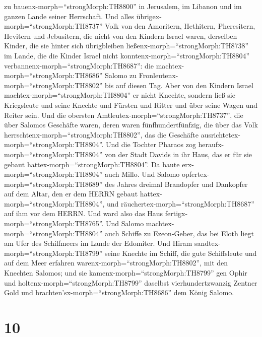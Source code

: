 zu bauenx-morph=``strongMorph:TH8800'' in Jerusalem, im Libanon und im
ganzen Lande seiner Herrschaft.  Und alles
übrigex-morph=``strongMorph:TH8737'' Volk von den Amoritern, Hethitern,
Pheresitern, Hevitern und Jebusitern, die nicht von den Kindern Israel
waren,  derselben Kinder, die sie hinter sich übrigbleiben
ließenx-morph=``strongMorph:TH8738'' im Lande, die die Kinder Israel
nicht konntenx-morph=``strongMorph:TH8804''
verbannenx-morph=``strongMorph:TH8687'': die
machtex-morph=``strongMorph:TH8686'' Salomo zu
Fronleutenx-morph=``strongMorph:TH8802'' bis auf diesen Tag.
 Aber von den Kindern Israel
machtex-morph=``strongMorph:TH8804'' er nicht Knechte, sondern ließ sie
Kriegsleute und seine Knechte und Fürsten und Ritter und über seine
Wagen und Reiter sein.  Und die obersten
Amtleutex-morph=``strongMorph:TH8737'', die über Salomos Geschäfte
waren, deren waren fünfhundertfünfzig, die über das Volk
herrschtenx-morph=``strongMorph:TH8802'', das die Geschäfte
ausrichtetex-morph=``strongMorph:TH8804''.  Und die Tochter
Pharaos zog heraufx-morph=``strongMorph:TH8804'' von der Stadt Davids in
ihr Haus, das er für sie gebaut hattex-morph=``strongMorph:TH8804''. Da
baute erx-morph=``strongMorph:TH8804'' auch Millo.  Und
Salomo opfertex-morph=``strongMorph:TH8689'' des Jahres dreimal
Brandopfer und Dankopfer auf dem Altar, den er dem HERRN gebaut
hattex-morph=``strongMorph:TH8804'', und
räuchertex-morph=``strongMorph:TH8687'' auf ihm vor dem HERRN. Und ward
also das Haus fertigx-morph=``strongMorph:TH8765''.  Und
Salomo machtex-morph=``strongMorph:TH8804'' auch Schiffe zu Ezeon-Geber,
das bei Eloth liegt am Ufer des Schilfmeers im Lande der Edomiter.
 Und Hiram sandtex-morph=``strongMorph:TH8799'' seine
Knechte im Schiff, die gute Schiffsleute und auf dem Meer erfahren
warenx-morph=``strongMorph:TH8802'', mit den Knechten Salomos;
 und sie kamenx-morph=``strongMorph:TH8799'' gen Ophir und
holtenx-morph=``strongMorph:TH8799'' daselbst vierhundertzwanzig Zentner
Gold und brachten'sx-morph=``strongMorph:TH8686'' dem König Salomo.

\hypertarget{section-9}{%
\section{10}\label{section-9}}

